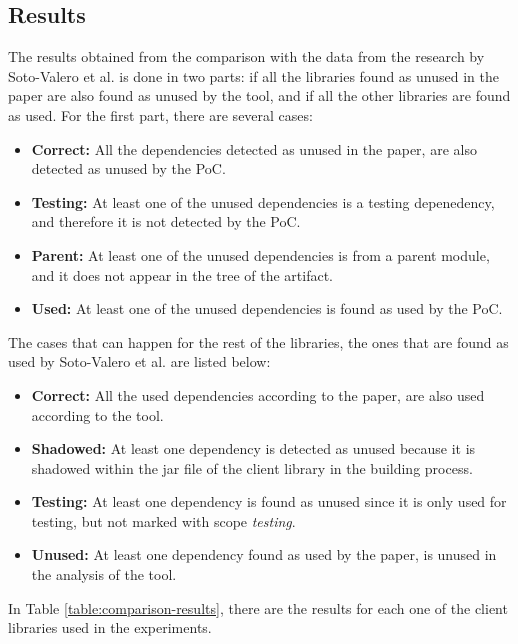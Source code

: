 \subsection{Results}

The results obtained from the comparison with the data from the research by Soto-Valero et al. \cite{soto2020comprehensive} is done in two parts: if all the libraries found as unused in the paper are also found as unused by the tool, and if all the other libraries are found as used. For the first part, there are several cases:

\begin{itemize}
  \item \textbf{Correct:} All the dependencies detected as unused in the paper, are also detected as unused by the PoC.
  \item \textbf{Testing:} At least one of the unused dependencies is a testing depenedency, and therefore it is not detected by the PoC.
  \item \textbf{Parent:} At least one of the unused dependencies is from a parent module, and it does not appear in the tree of the artifact.
  \item \textbf{Used:} At least one of the unused dependencies is found as used by the PoC.
\end{itemize}

The cases that can happen for the rest of the libraries, the ones that are found as used by Soto-Valero et al. are listed below:

\begin{itemize}
  \item \textbf{Correct:} All the used dependencies according to the paper, are also used according to the tool.
  \item \textbf{Shadowed:} At least one dependency is detected as unused because it is shadowed within the jar file of the client library in the building process.
  \item \textbf{Testing:} At least one dependency is found as unused since it is only used for testing, but not marked with scope \textit{testing}.
  \item \textbf{Unused:} At least one dependency found as used by the paper, is unused in the analysis of the tool.
\end{itemize}

In Table \ref{table:comparison-results}, there are the results for each one of the client libraries used in the experiments.

